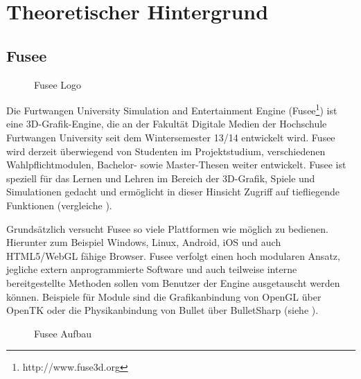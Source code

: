 \section{Theoretischer Hintergrund}

\subsection{Fusee}
\label{sec:fusee}

\begin{figure}[htbp]
  \centering
  \caption{Fusee Logo}
  \label{fig:FuseeLogo}
\end{figure}

Die Furtwangen University Simulation and Entertainment Engine (Fusee\footnote{http://www.fuse3d.org}) ist eine 3D-Grafik-Engine, die an der Fakultät Digitale Medien der Hochschule Furtwangen University seit dem Wintersemester 13/14 entwickelt wird. Fusee wird derzeit überwiegend von Studenten im Projektstudium, verschiedenen Wahlpflichtmodulen, Bachelor- sowie Master-Thesen weiter entwickelt. Fusee ist speziell für das Lernen und Lehren im Bereich der 3D-Grafik, Spiele und Simulationen gedacht und ermöglicht in dieser Hinsicht Zugriff auf tiefliegende Funktionen (vergleiche \cite{Muller.2014}).

Grundsätzlich versucht Fusee so viele Plattformen wie möglich zu bedienen. Hierunter zum Beispiel Windows, Linux, Android, iOS und auch HTML5/WebGL fähige Browser. Fusee verfolgt einen hoch modularen Ansatz, jegliche extern anprogrammierte Software und auch teilweise interne bereitgestellte Methoden sollen vom Benutzer der Engine ausgetauscht werden können. Beispiele für Module sind die Grafikanbindung von OpenGL über OpenTK oder die Physikanbindung von Bullet über BulletSharp (siehe \cite{Schey.2014}).

\begin{figure}[htbp]
  \centering
  \caption{Fusee Aufbau}
  \label{fig:FuseeAufbau}
\end{figure}

